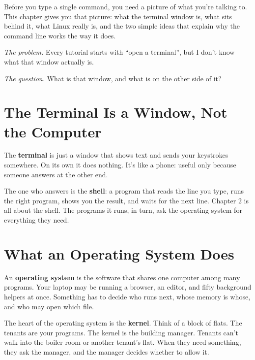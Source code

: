 
\begin{chapterintro}

Before you type a single command, you need a picture of what you're talking to. This chapter gives you that picture: what the terminal window is, what sits behind it, what Linux really is, and the two simple ideas that explain why the command line works the way it does.

\end{chapterintro}

\emph{The problem.} Every tutorial starts with ``open a terminal'', but I don't know what that window actually is.

\emph{The question.} What is that window, and what is on the other side of it?

\section{The Terminal Is a Window, Not the Computer}\label{01-the-machine-behind-the-terminal:the-terminal-is-a-window-not-the-computer}

The \textbf{terminal} is just a window that shows text and sends your keystrokes somewhere. On its own it does nothing. It's like a phone: useful only because someone answers at the other end.

The one who answers is the \textbf{shell}: a program that reads the line you type, runs the right program, shows you the result, and waits for the next line. Chapter 2 is all about the shell. The programs it runs, in turn, ask the operating system for everything they need.

\section{What an Operating System Does}\label{01-the-machine-behind-the-terminal:what-an-operating-system-does}

An \textbf{operating system} is the software that shares one computer among many programs. Your laptop may be running a browser, an editor, and fifty background helpers at once. Something has to decide who runs next, whose memory is whose, and who may open which file.

The heart of the operating system is the \textbf{kernel}. Think of a block of flats. The tenants are your programs. The kernel is the building manager. Tenants can't walk into the boiler room or another tenant's flat. When they need something, they ask the manager, and the manager decides whether to allow it.

